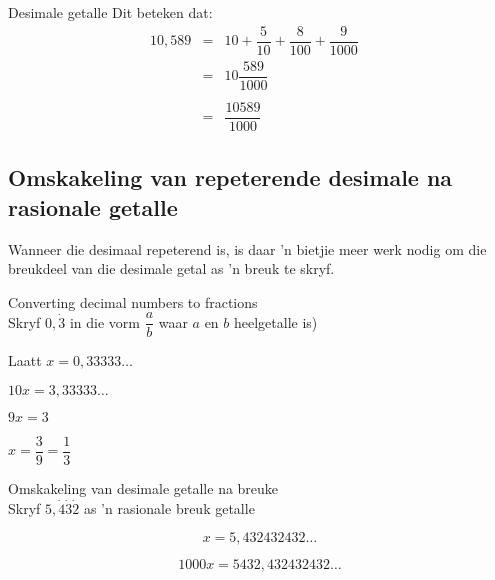 \begin{Aktiwiteit}{Desimale getalle}
Dit beteken dat:
\begin{equation*}
 \begin{array}{lll}10,589& = &10 + \dfrac{5}{10} + \dfrac{8}{100} + \dfrac{9}{1000} &\\ 
  &=& 10 \dfrac{589}{1000} \\
\\
&=& \dfrac{10589}{1000}
 \end{array}

\end{equation*}

\subsection*{Omskakeling van repeterende desimale na rasionale getalle}


Wanneer die desimaal repeterend is, is daar ’n bietjie meer werk nodig om die breukdeel van die desimale getal
as ’n breuk te skryf.\par 

\begin{wex}
{%
Converting decimal numbers to fractions
}
{%
\\
Skryf $0,\dot{3}$ in die vorm $\dfrac{a}{b}$ waar $a$ en $b$ heelgetalle is)
}
{%

Laatt $x = 0,33333\ldots$



$10x = 3,33333\ldots$



$9x = 3 $


$ x = \dfrac{3}{9} = \dfrac{1}{3} $
}
\end{wex}


\begin{wex}
{%
Omskakeling van  desimale getalle na breuke
}
{%
\\Skryf $5,\dot{4}\dot{3}\dot{2}$ as 'n rasionale breuk getalle
}
{%


$$ x = 5,432432432\ldots $$


$$ 1000x = 5432,432432432\ldots $$


}
\end{wex}
\end{Aktiwiteit}
